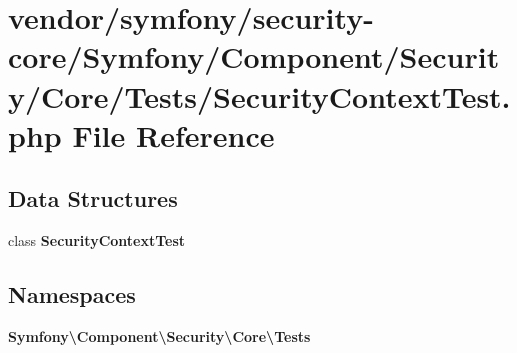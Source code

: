 \section{vendor/symfony/security-\/core/\+Symfony/\+Component/\+Security/\+Core/\+Tests/\+Security\+Context\+Test.php File Reference}
\label{_security_context_test_8php}
\subsection*{Data Structures}
\begin{DoxyCompactItemize}
\item 
class {\bf Security\+Context\+Test}
\end{DoxyCompactItemize}
\subsection*{Namespaces}
\begin{DoxyCompactItemize}
\item 
 {\bf Symfony\textbackslash{}\+Component\textbackslash{}\+Security\textbackslash{}\+Core\textbackslash{}\+Tests}
\end{DoxyCompactItemize}
